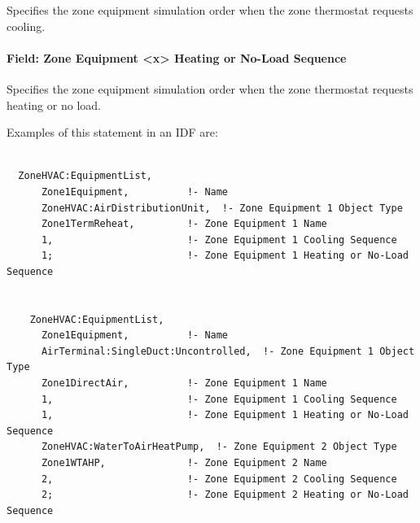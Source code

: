 Specifies the zone equipment simulation order when the zone thermostat requests cooling.

\paragraph{Field: Zone Equipment \textless{}x\textgreater{} Heating or No-Load Sequence}\label{field-zone-equipment-x-heating-or-no-load-sequence}

Specifies the zone equipment simulation order when the zone thermostat requests heating or no load.

Examples of this statement in an IDF are:

\begin{lstlisting}

  ZoneHVAC:EquipmentList,
      Zone1Equipment,          !- Name
      ZoneHVAC:AirDistributionUnit,  !- Zone Equipment 1 Object Type
      Zone1TermReheat,         !- Zone Equipment 1 Name
      1,                       !- Zone Equipment 1 Cooling Sequence
      1;                       !- Zone Equipment 1 Heating or No-Load Sequence


    ZoneHVAC:EquipmentList,
      Zone1Equipment,          !- Name
      AirTerminal:SingleDuct:Uncontrolled,  !- Zone Equipment 1 Object Type
      Zone1DirectAir,          !- Zone Equipment 1 Name
      1,                       !- Zone Equipment 1 Cooling Sequence
      1,                       !- Zone Equipment 1 Heating or No-Load Sequence
      ZoneHVAC:WaterToAirHeatPump,  !- Zone Equipment 2 Object Type
      Zone1WTAHP,              !- Zone Equipment 2 Name
      2,                       !- Zone Equipment 2 Cooling Sequence
      2;                       !- Zone Equipment 2 Heating or No-Load Sequence
\end{lstlisting}
